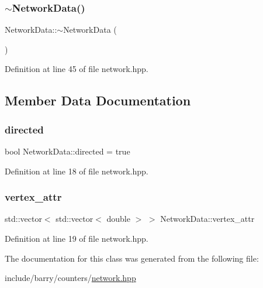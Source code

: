 \subsubsection{\texorpdfstring{$\sim$\+Network\+Data()}{~NetworkData()}}
{\footnotesize\ttfamily Network\+Data\+::$\sim$\+Network\+Data (\begin{DoxyParamCaption}{ }\end{DoxyParamCaption})\hspace{0.3cm}{\ttfamily [inline]}}



Definition at line 45 of file network.\+hpp.



\subsection{Member Data Documentation}
\mbox{\label{class_network_data_a5e67b89f22ad1151680a5f4428c6c780}} 
\subsubsection{\texorpdfstring{directed}{directed}}
{\footnotesize\ttfamily bool Network\+Data\+::directed = true}



Definition at line 18 of file network.\+hpp.

\mbox{\label{class_network_data_a3dc3e5549abc6daa85f30dbdc504ecac}} 
\subsubsection{\texorpdfstring{vertex\+\_\+attr}{vertex\_attr}}
{\footnotesize\ttfamily std\+::vector$<$ std\+::vector$<$ double $>$ $>$ Network\+Data\+::vertex\+\_\+attr}



Definition at line 19 of file network.\+hpp.



The documentation for this class was generated from the following file\+:\begin{DoxyCompactItemize}
\item 
include/barry/counters/\hyperlink{network_8hpp}{network.\+hpp}\end{DoxyCompactItemize}
